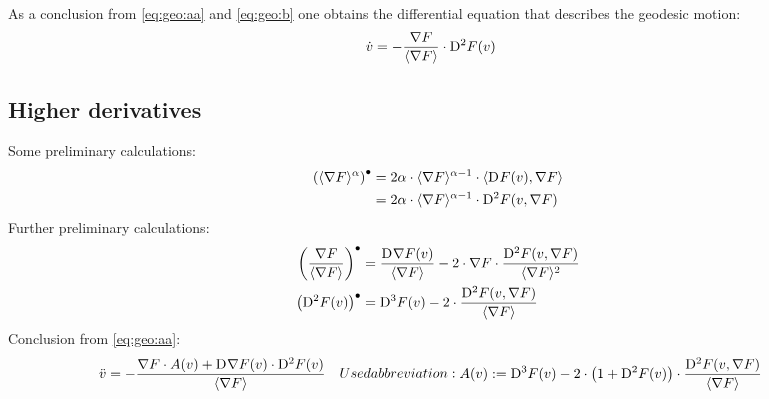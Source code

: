 As a conclusion from \eqref{eq:geo:aa} and \eqref{eq:geo:b}
one obtains the differential equation that describes the geodesic motion:
\begin{align}
\dot{ v }   &=  -\frac{ \nabla F  }{ \langle  \nabla F   \rangle } \cdot \mathrm{D}^{  2  } F ( v )
\end{align}



\subsection{Higher derivatives}



Some preliminary calculations:
\begin{subequations}    
    \begin{align}
        \left( \langle  \nabla F  \rangle^\alpha \right)^\bullet
        &=
        2 \alpha \cdot \langle  \nabla F  \rangle^{\alpha-1} \cdot
        \langle  \mathrm{D}^{  }F( v ) ,  \nabla F  \rangle   \\
        &=
        2 \alpha \cdot \langle  \nabla F  \rangle^{\alpha-1} \cdot
        \mathrm{D}^{ 2 }F( v, \nabla F )
    \end{align}
\end{subequations}
Further preliminary calculations:
\begin{align}
\left( \frac{ \nabla F  }{ \langle  \nabla F   \rangle } \right)^\bullet
&=   \frac{ \mathrm{D}^{  } \nabla F  ( v ) }{ \langle  \nabla F   \rangle }
            -  2 \cdot \nabla F  \cdot \frac{ \mathrm{D}^{  2  } F ( v, \nabla F  ) }{ \langle  \nabla F   \rangle^2 }\\
\left( \mathrm{D}^{  2  } F ( v ) \right)^\bullet  &=
\mathrm{D}^{  3  } F ( v )  -  2 \cdot \frac{ \mathrm{D}^{  2  } F ( v, \nabla F  ) }{ \langle  \nabla F   \rangle }
\end{align}
Conclusion from \eqref{eq:geo:aa}:
\begin{subequations}
\begin{align}
\ddot{ v }   &=
- \frac{ \grad F \mult A( v )  +
\diff{}{ \grad{ F } }( v ) \mult \diff{ 2 }{ F }( v ) }{ \skaq{ \grad{ F } } }
\end{align}
Used abbreviation:
\begin{align}
A( v )  &:=
\diff{ 3 }{ F }( v ) -
2 \mult \left( 1 + \diff{ 2 }{ F }( v ) \right) \mult
\frac{ \diff{ 2 }{ F }( v, \grad{ F } ) }{ \skaq{ \grad{ F } } }
\end{align}
\end{subequations}
